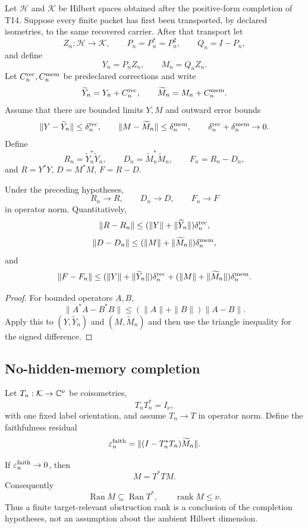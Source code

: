 Let $\mathcal H$ and $\mathcal K$ be Hilbert spaces obtained after the positive-form completion of T14. Suppose every finite packet has first been transported, by declared isometries, to the same recovered carrier. After that transport let
\[
Z_n:\mathcal H\to\mathcal K,
\qquad
P_n=P_n^*=P_n^2,
\qquad
Q_n=I-P_n,
\]
and define
\[
Y_n=P_nZ_n,
\qquad
M_n=Q_nZ_n.
\]
Let $C_n^{\rm rec},C_n^{\rm mem}$ be predeclared corrections and write
\[
\widetilde Y_n=Y_n+C_n^{\rm rec},
\qquad
\widetilde M_n=M_n+C_n^{\rm mem}.
\]
Assume that there are bounded limits $Y,M$ and outward error bounds
\[
\|Y-\widetilde Y_n\|\le\delta_n^{\rm rec},
\qquad
\|M-\widetilde M_n\|\le\delta_n^{\rm mem},
\qquad
\delta_n^{\rm rec}+\delta_n^{\rm mem}\to0.
\]
Define
\[
R_n=\widetilde Y_n^*\widetilde Y_n,
\qquad
D_n=\widetilde M_n^*\widetilde M_n,
\qquad
F_n=R_n-D_n,
\]
and $R=Y^*Y$, $D=M^*M$, $F=R-D$.

\begin{theorem}
Under the preceding hypotheses,
\[
R_n\to R,\qquad D_n\to D,\qquad F_n\to F
\]
in operator norm. Quantitatively,
\[
\|R-R_n\|
\le(\|Y\|+\|\widetilde Y_n\|)\delta_n^{\rm rec},
\]
\[
\|D-D_n\|
\le(\|M\|+\|\widetilde M_n\|)\delta_n^{\rm mem},
\]
and
\[
\|F-F_n\|
\le(\|Y\|+\|\widetilde Y_n\|)\delta_n^{\rm rec}
 +(\|M\|+\|\widetilde M_n\|)\delta_n^{\rm mem}.
\]
\end{theorem}

\begin{proof}
For bounded operators $A,B$,
\[
\|A^*A-B^*B\|
\le(\|A\|+\|B\|)\|A-B\|.
\]
Apply this to $(Y,\widetilde Y_n)$ and $(M,\widetilde M_n)$ and then use the triangle inequality for the signed difference.
\end{proof}

\subsection{No-hidden-memory completion}

Let $T_n:\mathcal K\to\mathbb C^\nu$ be coisometries,
\[
T_nT_n^*=I_\nu,
\]
with one fixed label orientation, and assume $T_n\to T$ in operator norm. Define the faithfulness residual
\[
\varepsilon_n^{\rm faith}
=\|(I-T_n^*T_n)\widetilde M_n\|.
\]

\begin{theorem}
If $\varepsilon_n^{\rm faith}\to0$, then
\[
M=T^*TM.
\]
Consequently
\[
\overline{\operatorname{Ran}M}\subseteq\operatorname{Ran}T^*,
\qquad
\operatorname{rank}M\le\nu.
\]
Thus a finite target-relevant obstruction rank is a conclusion of the completion hypotheses, not an assumption about the ambient Hilbert dimension.
\end{theorem}

